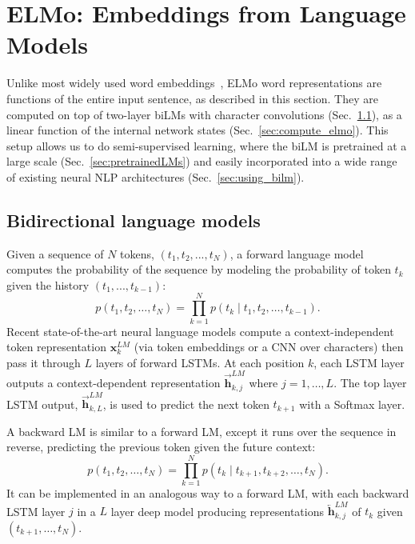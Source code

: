\documentclass[11pt,a4paper]{article}
\newcommand{\ELMO}{ELMo}
\begin{document}
\section{\ELMO: Embeddings from Language Models}
\label{sec:elmo}

Unlike most widely used word embeddings~\citep{Pennington2014GloveGV}, \ELMO{} word representations are functions of the entire input sentence, as described in this section. They are computed on top of two-layer biLMs with character convolutions (Sec.~\ref{sec:bilm_def}), as a linear function of the internal network states (Sec.~\ref{sec:compute_elmo}). This setup allows us to do semi-supervised learning, where the biLM is pretrained at a large scale (Sec.~\ref{sec:pretrainedLMs}) and easily incorporated into a wide range of existing neural NLP architectures (Sec.~\ref{sec:using_bilm}). 


\subsection{Bidirectional language models}
\label{sec:bilm_def}
Given a sequence of $N$ tokens, $(t_1, t_2, ..., t_N)$, a forward language model computes the probability of the sequence
by modeling the probability of token $t_k$ given the history $(t_1, ..., t_{k-1})$:
\[
p(t_1, t_2, \ldots, t_N) = \prod_{k=1}^N p({t_k} \mid t_1, t_2, \ldots, t_{k-1}).
\]
Recent state-of-the-art neural language models \citep{Jzefowicz2016ExploringTL,Melis2017OnTS,Merity2017RegularizingAO}
compute a context-independent token representation $\mathbf{x}^{LM}_{k}$
(via token embeddings or a CNN over characters) then pass it through $L$ layers of forward LSTMs.
At each position $k$, each LSTM layer outputs a context-dependent representation $\overrightarrow{\mathbf{h}}^{LM}_{k,j}$ where $j=1, \ldots, L$.
The top layer LSTM output, $\overrightarrow{\mathbf{h}}^{LM}_{k,L}$, is used to predict the next token $t_{k+1}$ with a Softmax layer.


A backward LM is similar to a forward LM, except it runs over the sequence in reverse, predicting the previous token given the future context: 
\[
p(t_1, t_2, \ldots, t_N) = \prod_{k=1}^N p(t_k \mid t_{k+1}, t_{k+2}, \ldots, t_N).
\]
It can be implemented in an analogous way to a forward LM, with each backward LSTM layer $j$ in a $L$ layer deep model producing
representations $\overleftarrow{\mathbf{h}}^{LM}_{k,j}$ of $t_k$ given $(t_{k+1}, \ldots, t_N)$.
\end{document}
